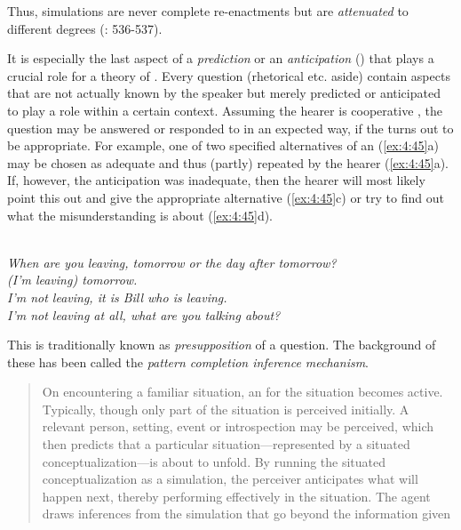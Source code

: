 \noindent Thus, simulations are never complete re-enactments but are \textit{attenuated} to different degrees (\citealt{Langacker2008}: 536-537).

It is especially the last aspect of a \textit{prediction} or an \textit{anticipation} (\citealt{Järvilehto2009}) that plays a crucial role for a theory of . Every question (rhetorical  etc. aside) contain aspects that are not actually known by the speaker but merely predicted or anticipated to play a role within a certain context. Assuming the hearer is cooperative \citep{Tomasello2014b}, the question may be answered or responded to in an expected way, if the  turns out to be appropriate. For example, one of two specified alternatives of an  (\ref{ex:4:45}a) may be chosen as adequate and thus (partly) repeated by the hearer (\ref{ex:4:45}a). If, however, the anticipation was inadequate, then the hearer will most likely point this out and give the appropriate alternative (\ref{ex:4:45}c) or try to find out what the misunderstanding is about (\ref{ex:4:45}d).

\ea%
    \label{ex:4:45}
    \\
    \ea
      \textit{When are you leaving, tomorrow or the day after tomorrow?}\\

    \ex
      \textit{(I’m leaving) tomorrow.}\\

    \ex
      \textit{I’m not leaving, it is Bill who is leaving.}\\

    \ex
      \textit{I’m not leaving at all, what are you talking about?}\\
    \z
    \z 

\noindent This is traditionally known as \textit{presupposition} of a question. The background of these  has been called the \textit{pattern completion inference mechanism}.

\begin{quote}
On encountering a familiar situation, an  for the situation becomes active. Typically, though only part of the situation is perceived initially. A relevant person, setting, event or introspection may be perceived, which then predicts that a particular situation—represented by a situated conceptualization—is about to unfold. By running the situated conceptualization as a simulation, the perceiver anticipates what will happen next, thereby performing effectively in the situation. The agent draws inferences from the simulation that go beyond the information given \citep[1284]{Barsalou2009}
\end{quote}

